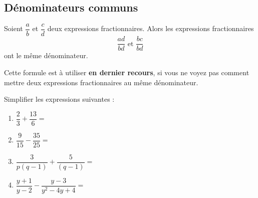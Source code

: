 \documentclass{poly}
\begin{document}
\subsection{Dénominateurs communs}
\begin{proposition}
Soient $\dfrac{a}{b}$ et $\dfrac{c}{d}$ deux expressions fractionnaires. Alors les expressions fractionnaires
\begin{equation*}
\dfrac{ad}{bd} \text{ et } \dfrac{bc}{bd}    
\end{equation*}
ont le même dénominateur.
\end{proposition}
\begin{remark}
Cette formule est à utiliser \textbf{en dernier recours}, si vous ne voyez pas comment mettre deux expressions fractionnaires au même dénominateur.
\end{remark}
\begin{example}
Simplifier les expressions suivantes : 
\begin{enumerate}[label=\emph{\alph*)}]
\item $\dfrac{2}{3} + \dfrac{13}{6} =$ \answerline
\item $\dfrac{9}{15} - \dfrac{35}{25} = $
\answerline
\item $\dfrac{3}{p(q-1)} + \dfrac{5}{(q-1)} = $ \answerline 
\item $\dfrac{y + 1}{y - 2} - \dfrac{y - 3}{y^2 - 4y + 4} =$ \answerline
\end{enumerate}
\end{example}
\end{document}
